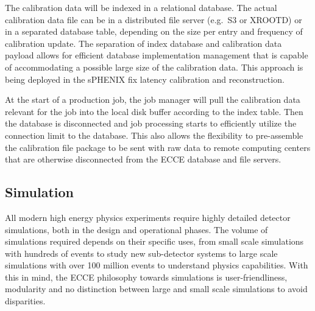 The calibration data will be indexed in a relational database. The actual calibration data file can be in a distributed file server (e.g.\ S3 or XROOTD) or in a separated database table, depending on the size per entry and frequency of calibration update. The separation of index database and calibration data payload allows for efficient database implementation management that is capable of accommodating a possible large size of the calibration data. This approach is being deployed in the sPHENIX fix latency calibration and reconstruction.

At the start of a production job, the job manager will pull the calibration data relevant for the job into the local disk buffer according to the index table. Then the database is disconnected and job processing starts to efficiently utilize the connection limit to the database. This also allows the flexibility to pre-assemble the calibration file package to be sent with raw data to remote computing centers that are otherwise disconnected from the ECCE database and file servers. 





\subsection{Simulation}






	All modern high energy physics experiments require highly detailed detector simulations, both in the design and operational phases. The volume of simulations required depends on their specific uses, from small scale simulations with hundreds of events to study new sub-detector systems to large scale simulations with over 100 million events to understand physics capabilities. With this in mind, the ECCE philosophy towards simulations is user-friendliness, modularity and no distinction between large and small scale simulations to avoid disparities. 
	
